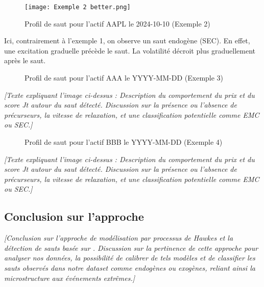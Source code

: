\documentclass[10pt,a4paper]{article}
\theoremstyle{definition}
\theoremstyle{remark}
\begin{document}
\begin{itemize}
    \vspace{1cm}

    \begin{figure}[H]
        \centering
        \texttt{[image: Exemple 2 better.png]}
        \caption{Profil de saut pour l'actif AAPL le 2024-10-10 (Exemple 2)}
        \label{fig:jump_example_2}
    \end{figure}

    Ici, contrairement à l'exemple 1, on observe un saut endogène (SEC). En effet, une excitation graduelle précède le saut. La volatilité décroit plus graduellement après le saut. 
    

    \vspace{1cm}

    \begin{figure}[H]
        \centering
        \fbox{\rule{0pt}{4cm}\qquad\rule{8cm}{0pt}} %
        \caption{Profil de saut pour l'actif AAA le YYYY-MM-DD (Exemple 3)}
        \label{fig:jump_example_3}
    \end{figure}
    \textit{[Texte expliquant l'image ci-dessus : Description du comportement du prix et du score Jt autour du saut détecté. Discussion sur la présence ou l'absence de précurseurs, la vitesse de relaxation, et une classification potentielle comme EMC ou SEC.]}

    \vspace{1cm}

    \begin{figure}[H]
        \centering
        \fbox{\rule{0pt}{4cm}\qquad\rule{8cm}{0pt}} %
        \caption{Profil de saut pour l'actif BBB le YYYY-MM-DD (Exemple 4)}
        \label{fig:jump_example_4}
    \end{figure}
    \textit{[Texte expliquant l'image ci-dessus : Description du comportement du prix et du score Jt autour du saut détecté. Discussion sur la présence ou l'absence de précurseurs, la vitesse de relaxation, et une classification potentielle comme EMC ou SEC.]}

    \subsection{Conclusion sur l'approche}

    \textit{[Conclusion sur l'approche de modélisation par processus de Hawkes et la détection de sauts basée sur \cite{marcaccioli2021exogenous}. Discussion sur la pertinence de cette approche pour analyser nos données, la possibilité de calibrer de tels modèles et de classifier les sauts observés dans notre dataset comme endogènes ou exogènes, reliant ainsi la microstructure aux événements extrêmes.]}


\end{itemize}
\end{document}
